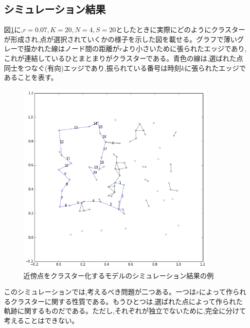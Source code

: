 \subsection{シミュレーション結果}
図\ref{fig:f15}に,$r=0.07, K=20, N=4, S=20$としたときに実際にどのようにクラスターが形成され,点が選択されていくかの様子を示した図を載せる。グラフで薄いグレーで描かれた線はノード間の距離が$r$より小さいために張られたエッジであり,これが連結しているひとまとまりがクラスターである。青色の線は,選ばれた点同士をつなぐ(有向)エッジであり,振られている番号は時刻$k$に張られたエッジであることを表す。
\begin{figure}[H]
    \begin{center}
        \includegraphics[width=10cm]{../img/cluster.png}
        \caption{近傍点をクラスター化するモデルのシミュレーション結果の例}
        \label{fig:f15}
    \end{center}
\end{figure}

このシミュレーションでは,考えるべき問題が二つある。一つは$r$によって作られるクラスターに関する性質である。もうひとつは,選ばれた点によって作られた軌跡に関するものだである。ただし,それぞれが独立でないために,完全に分けて考えることはできない。

